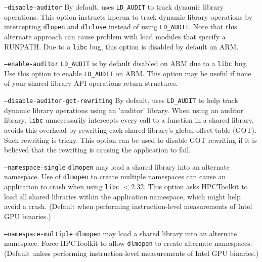 \begin{description}
\item{{\tt --disable-auditor}}  By default, \hpcrun{} uses \verb|LD_AUDIT| to track dynamic library
                       operations. This option instructs hpcrun
                       to track dynamic library operations by intercepting
                       {\tt dlopen} and {\tt dlclose}  instead of using \verb|LD_AUDIT|. Note
                       that this alternate approach can cause problem with
                       load modules that specify a RUNPATH. Due to a {\tt libc} bug,
                       this option is disabled by default on ARM. 
                       
\item{{\tt --enable-auditor}}    \verb|LD_AUDIT| is by default disabled on ARM due to a {\tt libc} bug.
                       Use this option to enable \verb|LD_AUDIT| on ARM. This option may be useful if none of your shared library API operations return structures.
                       
\item{{\tt --disable-auditor-got-rewriting}}
                       By default, \hpcrun{} uses \verb|LD_AUDIT| to help track dynamic
                       library operations using an 'auditor' library. When using
                       an auditor library, {\tt libc} unnecessarily intercepts
                       every call to a function in a shared library. \hpcrun{}
                       avoids this overhead by rewriting each shared library's
                       global offset table (GOT). Such rewriting is tricky.
                       This option can be used to disable GOT rewriting if
                       it is believed that the rewriting is causing the
                       application to fail.
                       
\item{{\tt --namespace-single}}   {\tt dlmopen} may load a shared library into an alternate
                       namespace.  Use of {\tt dlmopen} to create multiple namespaces
                       can cause an application to crash when using {\tt libc} $< 2.32$. This option asks HPCToolkit to load all
                       shared libraries within the application namespace, which
                       might help avoid a crash.  (Default when performing
                       instruction-level measurements of Intel GPU binaries.)
                       
\item{{\tt --namespace-multiple}} {\tt dlmopen} may load a shared library into an alternate
                       namespace. Force HPCToolkit to allow {\tt dlmopen} to create
                       alternate namespaces.  (Default unless performing
                       instruction-level measurements of Intel GPU binaries.)
 \end{description}
 
